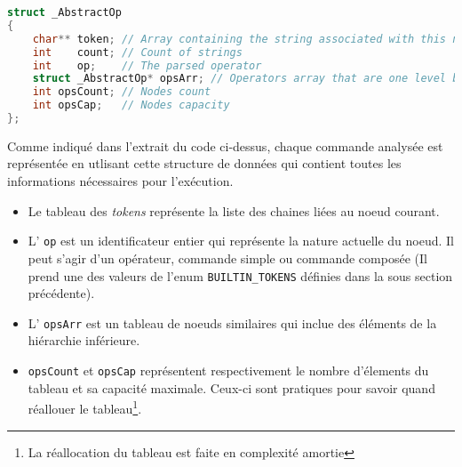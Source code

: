 \documentclass[12pt]{article}
\begin{document}

\begin{lstlisting}[language=C]
struct _AbstractOp
{
    char** token; // Array containing the string associated with this node
    int    count; // Count of strings
    int    op;    // The parsed operator
    struct _AbstractOp* opsArr; // Operators array that are one level below the current node in precedence
    int opsCount; // Nodes count
    int opsCap;   // Nodes capacity
};
\end{lstlisting}

Comme indiqué dans l'extrait du code ci-dessus, chaque commande analysée est représentée en utlisant cette structure de données qui contient toutes les informations nécessaires pour l'exécution.


\begin{itemize}
    \item Le tableau des \textit{tokens} représente la liste des chaines liées au noeud courant.
    \item L' \texttt{op} est un identificateur entier qui représente la nature actuelle du noeud. Il peut s'agir d'un opérateur, commande simple ou commande composée (Il prend une des valeurs de l'enum \texttt{BUILTIN\_TOKENS} définies dans la sous section précédente).
    \item L' \texttt{opsArr} est un tableau de noeuds similaires qui inclue des éléments de la hiérarchie inférieure.
    \item \texttt{opsCount} et \texttt{opsCap} représentent respectivement le nombre d'élements du tableau et sa capacité maximale. Ceux-ci sont pratiques pour savoir quand réallouer le tableau\footnote{La réallocation du tableau est faite en complexité amortie}.
\end{itemize}

\end{document}
